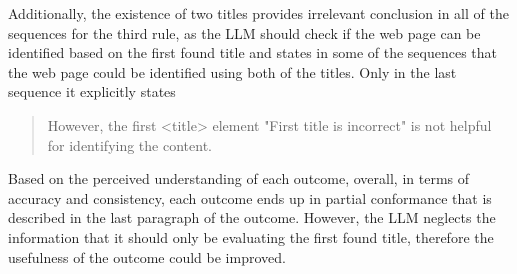 Additionally, the existence of two titles provides irrelevant conclusion in all of the sequences for the third rule, as the LLM should check if the web page can be identified based on the first found title and states in some of the sequences that the web page could be identified using both of the titles. Only in the last sequence it explicitly states \blockquote{However, the first <title> element "First title is incorrect" is not helpful for identifying the content.}

Based on the perceived understanding of each outcome, overall, in terms of accuracy and consistency, each outcome ends up in partial conformance that is described in the last paragraph of the outcome. However, the LLM neglects the information that it should only be evaluating the first found title, therefore the usefulness of the outcome could be improved.